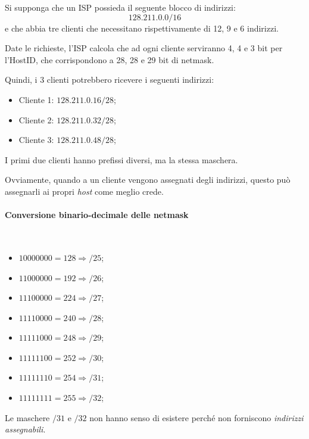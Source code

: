\begin{eg}
    Si supponga che un ISP possieda il seguente blocco di indirizzi:
    \[128.211.0.0/16\]
    e che abbia tre clienti che necessitano rispettivamente di 12, 9 e 6
    indirizzi.

    Date le richieste, l'ISP calcola che ad ogni cliente serviranno 4, 4 e 3 bit
    per l'HostID, che corrispondono a 28, 28 e 29 bit di netmask.

    Quindi, i 3 clienti potrebbero ricevere i seguenti indirizzi:
    \begin{itemize}
        \item Cliente 1: $128.211.0.16/28$;
        \item Cliente 2: $128.211.0.32/28$;
        \item Cliente 3: $128.211.0.48/28$;
    \end{itemize}
\end{eg}
\begin{note}
    I primi due clienti hanno prefissi diversi, ma la stessa maschera.
\end{note}\noindent
Ovviamente, quando a un cliente vengono assegnati degli indirizzi, questo può
assegnarli ai propri \emph{host} come meglio crede.

\paragraph{Conversione binario-decimale delle netmask}
\mbox{}\\
\begin{minipage}[t]{0.48\textwidth}\vspace{-3mm}
    \begin{itemize}
        \item $10000000 = 128 \Rightarrow /25$;
        \item $11000000 = 192 \Rightarrow /26$;
        \item $11100000 = 224 \Rightarrow /27$;
        \item $11110000 = 240 \Rightarrow /28$;
    \end{itemize}
\end{minipage}
\hfill
\begin{minipage}[t]{0.48\textwidth}\vspace{-3mm}
    \begin{itemize}
        \item $11111000 = 248 \Rightarrow /29$;
        \item $11111100 = 252 \Rightarrow /30$;
        \item $11111110 = 254 \Rightarrow /31$;
        \item $11111111 = 255 \Rightarrow /32$;
    \end{itemize}
\end{minipage}\vspace{0.5mm}
Le maschere $/31$ e $/32$ non hanno senso di esistere perché non forniscono
\emph{indirizzi assegnabili}.

